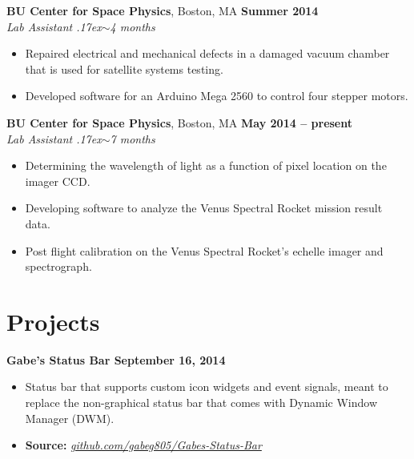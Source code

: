 \documentclass[line]{resume}
\newcommand{\about}{\raise.17ex\hbox{$\scriptstyle\mathtt{\sim}$}}
\begin{document}
\begin{resume}
    \textbf{BU Center for Space Physics}, Boston, MA \hfill \textbf{Summer 2014} \\
    \textsl{Lab Assistant \hfill \about 4 months}
    \vspace{1mm}
    \begin{itemize}[leftmargin=2em]
        \item Repaired electrical and mechanical defects in a damaged vacuum
          chamber that is used for satellite systems testing.
        \item Developed software for an Arduino Mega 2560 to control four stepper motors.
    \end{itemize}
    
    \textbf{BU Center for Space Physics}, Boston, MA \hfill \textbf{May 2014 -- present} \\
    \textsl{Lab Assistant \hfill \about 7 months}
    \vspace{1mm}
    \begin{itemize}[leftmargin=2em]
        \item Determining the wavelength of light as a function of pixel location on
          the imager CCD.
        \item Developing software to analyze the Venus Spectral Rocket mission result data.
        \item Post flight calibration on the Venus Spectral Rocket's echelle imager and spectrograph.
    \end{itemize}
    
    \section{\mysidestyle Projects}
    
    \textbf{Gabe's Status Bar \hfill September 16, 2014}
    \vspace{1mm}
    \begin{itemize}
        \item Status bar that supports custom icon widgets and event signals, meant
        to replace the non-graphical status bar that comes with Dynamic Window
        Manager (DWM).
        \item \textbf{Source: } \textsl{\href{http://github.com/gabeg805/Gabes-Status-Bar}{github.com/gabeg805/Gabes-Status-Bar}}
    \end{itemize}
    

\end{resume}
\end{document}
